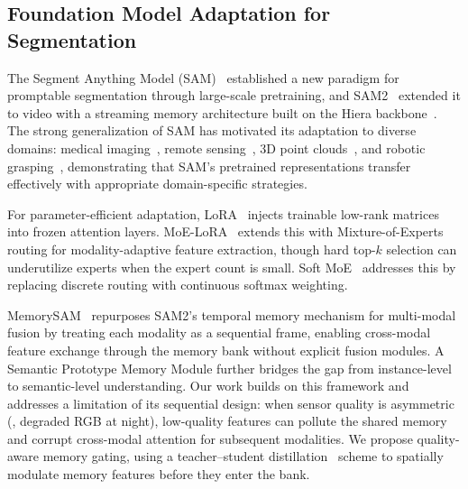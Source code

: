 \subsection{Foundation Model Adaptation for Segmentation}

The Segment Anything Model (SAM)~\cite{kirillov2023sam} established a new paradigm for promptable segmentation through large-scale pretraining, and SAM2~\cite{ravi2024sam2} extended it to video with a streaming memory architecture built on the Hiera backbone~\cite{ryali2023hiera}.
The strong generalization of SAM has motivated its adaptation to diverse domains: medical imaging~\cite{ma2024medsam}, remote sensing~\cite{chen2024rsprompter}, 3D point clouds~\cite{zhou2025pointsam}, and robotic grasping~\cite{noh2025graspsam}, demonstrating that SAM's pretrained representations transfer effectively with appropriate domain-specific strategies.

For parameter-efficient adaptation, LoRA~\cite{hu2022lora} injects trainable low-rank matrices into frozen attention layers.
MoE-LoRA~\cite{zhu2024moe} extends this with Mixture-of-Experts~\cite{shazeer2017moe} routing for modality-adaptive feature extraction, though hard top-$k$ selection can underutilize experts when the expert count is small.
Soft MoE~\cite{puigcerver2024softmoe} addresses this by replacing discrete routing with continuous softmax weighting.

MemorySAM~\cite{chen2025memorysam} repurposes SAM2's temporal memory mechanism for multi-modal fusion by treating each modality as a sequential frame, enabling cross-modal feature exchange through the memory bank without explicit fusion modules.
A Semantic Prototype Memory Module further bridges the gap from instance-level to semantic-level understanding.
Our work builds on this framework and addresses a limitation of its sequential design: when sensor quality is asymmetric (\eg, degraded RGB at night), low-quality features can pollute the shared memory and corrupt cross-modal attention for subsequent modalities.
We propose quality-aware memory gating, using a teacher--student distillation~\cite{hinton2015distilling} scheme to spatially modulate memory features before they enter the bank.
